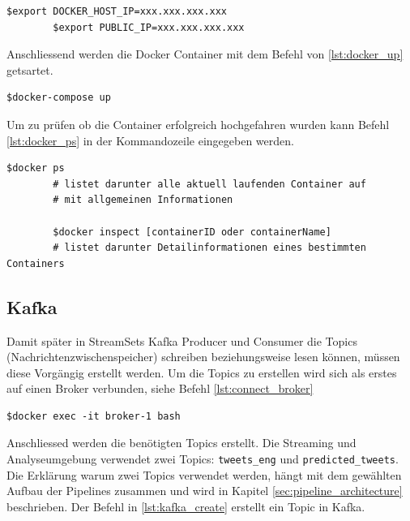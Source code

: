 \begin{lstlisting}[float=h,frame=tb,caption={Befehl um Umgebungsvariablen zu setzten},label=lst:set_ip]
		$export DOCKER_HOST_IP=xxx.xxx.xxx.xxx
		$export PUBLIC_IP=xxx.xxx.xxx.xxx		
		\end{lstlisting}

Anschliessend werden die Docker Container mit dem Befehl von \ref{lst:docker_up} getsartet.
\begin{lstlisting}[float=h,frame=tb,caption={Befehl um Docker Container zu starten},label=lst:docker_up]
		$docker-compose up
\end{lstlisting}

Um zu pr{\"u}fen ob die Container erfolgreich hochgefahren wurden kann Befehl \ref{lst:docker_ps} in der Kommandozeile eingegeben werden.
\begin{lstlisting}[float=h,frame=tb,caption={Befehl um Docker Container zu pr{\"u}fen},label=lst:docker_ps]
		$docker ps
		# listet darunter alle aktuell laufenden Container auf 
		# mit allgemeinen Informationen
		
		$docker inspect [containerID oder containerName]
		# listet darunter Detailinformationen eines bestimmten Containers
\end{lstlisting}

\clearpage

\subsection{Kafka}
Damit sp{\"a}ter in StreamSets Kafka Producer und Consumer die Topics (Nachrichtenzwischenspeicher) schreiben beziehungsweise lesen k{\"o}nnen, m{\"u}ssen diese Vorg{\"a}ngig erstellt werden. Um die Topics zu erstellen wird sich als erstes auf einen Broker verbunden, siehe Befehl \ref{lst:connect_broker}

\begin{lstlisting}[float=h,frame=tb,caption={Befehl um sich auf den Broker zu verbinden},label=lst:connect_broker]
		$docker exec -it broker-1 bash
\end{lstlisting}

Anschliessed werden die ben{\"o}tigten Topics erstellt. Die Streaming und Analyseumgebung verwendet zwei Topics: \texttt{tweets\_eng} und \texttt{predicted\_tweets}. Die Erkl{\"a}rung warum zwei Topics verwendet werden, h{\"a}ngt mit dem gew{\"a}hlten Aufbau der Pipelines zusammen und wird in Kapitel \ref{sec:pipeline_architecture} beschrieben. Der Befehl in \ref{lst:kafka_create} erstellt ein Topic in Kafka.

